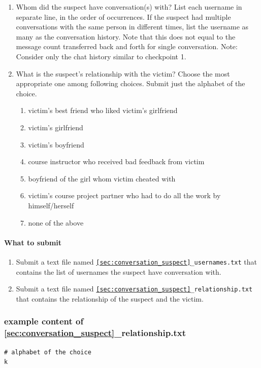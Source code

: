 \documentclass[letterpaper,12pt]{report}
\begin{document}
\begin{enumerate}
\item Whom did the suspect have conversation(s) with? List each username in separate line, in the order of occurrences. If the suspect had multiple conversations with the same person in different times, list the username as many as the conversation history. Note that this does not equal to the message count transferred back and forth for single conversation. Note: Consider only the chat history similar to checkpoint 1.
\item What is the suspect's relationship with the victim? Choose the most appropriate one among following choices. Submit just the alphabet of the choice.
    \begin{enumerate}
        \item victim's best friend who liked victim's girlfriend
        \item victim's girlfriend
        \item victim's boyfriend
        \item course instructor who received bad feedback from victim
        \item boyfriend of the girl whom victim cheated with
        \item victim's course project partner who had to do all the work by himself/herself
        \item none of the above
    \end{enumerate}
\end{enumerate}

\paragraph{What to submit}
\begin{enumerate}
\item Submit a text file named \texttt{\ref{sec:conversation_suspect}\_usernames.txt} that contains the list of usernames the suspect have conversation with.
\item Submit a text file named \texttt{\ref{sec:conversation_suspect}\_relationship.txt} that contains the relationship of the suspect and the victim.
\end{enumerate}

\subsubsection*{example content of {\ref{sec:conversation_suspect}\_relationship.txt}}
\begin{mdframed}
\begin{Verbatim}
# alphabet of the choice
k
\end{Verbatim}
\end{mdframed}
\end{document}
